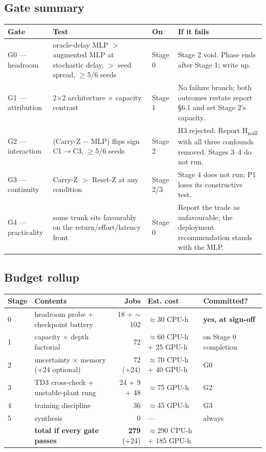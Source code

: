 \documentclass[11pt]{article}
\begin{document}
\subsection{Gate summary}

\begin{center}\small
\begin{tabular}{@{}p{}p{}p{}p{}@{}}
\toprule
\textbf{Gate} & \textbf{Test} & \textbf{On} & \textbf{If it fails} \\
\midrule
G0 --- headroom & oracle-delay MLP $>$ augmented MLP at stochastic delay, $>$ seed spread, $\geq$5/6 seeds & Stage 0 & Stage 2 void. Phase ends after Stage 1; write up. \\
G1 --- attribution & 2$\times$2 architecture $\times$ capacity contrast & Stage 1 & No failure branch; both outcomes restate report \S6.1 and set Stage 2's capacity. \\
G2 --- interaction & (Carry-Z $-$ MLP) flips sign C1$\to$C3, $\geq$5/6 seeds & Stage 2 & H3 rejected. Report H\textsubscript{null} with all three confounds removed. Stages 3--4 do not run. \\
G3 --- continuity & Carry-Z $>$ Reset-Z at any condition & Stage 2/3 & Stage 4 does not run; P1 loses its constructive test. \\
G4 --- practicality & some trunk sits favourably on the return/effort/latency front & Stage 0 & Report the trade as unfavourable; the deployment recommendation stands with the MLP. \\
\bottomrule
\end{tabular}
\end{center}

\subsection{Budget rollup}

\begin{center}\small
\begin{tabular}{@{}lp{}rp{}p{}@{}}
\toprule
\textbf{Stage} & \textbf{Contents} & \textbf{Jobs} & \textbf{Est. cost} & \textbf{Committed?} \\
\midrule
0 & headroom probe + checkpoint battery & 18 + ${\sim}$102 & $\approx$30 CPU-h & \textbf{yes, at sign-off} \\
1 & capacity $\times$ depth factorial & 72 & $\approx$60 CPU-h + 25 GPU-h & on Stage 0 completion \\
2 & uncertainty $\times$ memory (+24 optional) & 72 (+24) & $\approx$70 CPU-h + 40 GPU-h & G0 \\
3 & TD3 cross-check + unstable-plant rung & 24 + 9 + 48 & $\approx$75 GPU-h & G2 \\
4 & training discipline & 36 & $\approx$45 GPU-h & G3 \\
5 & synthesis & 0 & --- & always \\
\midrule
 & \textbf{total if every gate passes} & \textbf{279} (+24) & $\approx$290 CPU-h + 185 GPU-h & \\
\bottomrule
\end{tabular}
\end{center}
\end{document}
